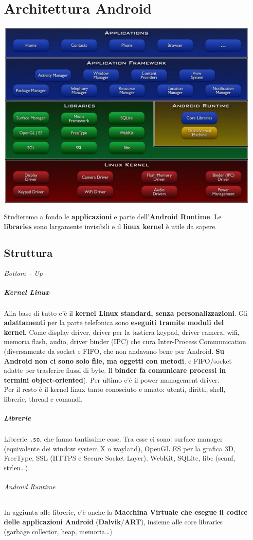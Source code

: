 \documentclass[10pt]{book}
\begin{document}
\chapter{Architettura Android}
\begin{center}
	\includegraphics[scale=0.7]{arch_thebigpicture.png}
\end{center}
Studieremo a fondo le \textbf{applicazioni} e parte dell'\textbf{Android Runtime}. Le \textbf{libraries} sono largamente invisibili e il \textbf{linux kernel} è utile da sapere.
\section{Struttura}
\textit{Bottom -- Up}
\paragraph{Kernel Linux} Alla base di tutto c'è il \textbf{kernel Linux standard, senza personalizzazioni}. Gli \textbf{adattamenti} per la parte telefonica sono \textbf{eseguiti tramite moduli del kernel}. Come display driver, driver per la tastiera keypad, driver camera, wifi, memoria flash, audio, driver binder (IPC) che cura Inter-Process Communication (diversamente da socket e FIFO, che non andavano bene per Android. \textbf{Su Android non ci sono solo file, ma oggetti con metodi}, e FIFO/socket adatte per trasferire flussi di byte. Il \textbf{binder fa comunicare processi in termini object-oriented}). Per ultimo c'è il power management driver.\\
Per il resto è il kernel linux tanto conosciuto e amato: utenti, diritti, shell, librerie, thread e comandi.
\paragraph{Librerie} Librerie \texttt{.so}, che fanno tantissime cose. Tra esse ci sono: surface manager (equivalente dei window system X o wayland), OpenGL ES per la grafica 3D, FreeType, SSL (HTTPS e Secure Socket Layer), WebKit, SQLite, libc (scanf, strlen\ldots).
\subparagraph{Android Runtime} In aggiunta alle librerie, c'è anche la \textbf{Macchina Virtuale che esegue il codice delle applicazioni Android} (\textbf{Dalvik}/\textbf{ART}), insieme alle core libraries (garbage collector, heap, memoria\ldots)
\end{document}
